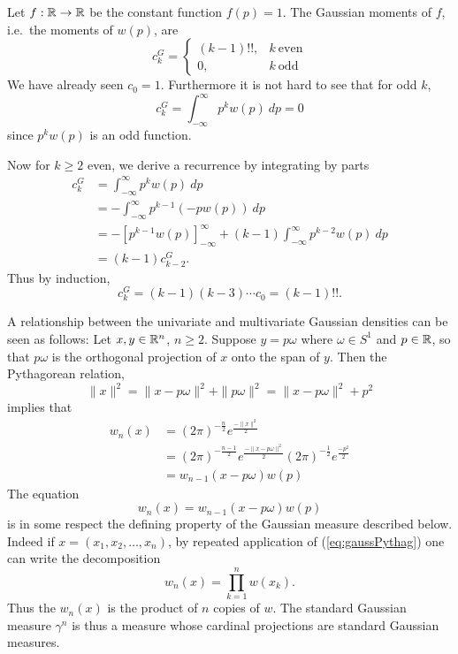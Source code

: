 \begin{myexample}
  Let $f: \mathbb{R} \rightarrow \mathbb{R}$ be the constant function $f(p)=1$. The Gaussian moments of $f$, i.e.\ the moments of $w(p)$, are
  \[
    c^G_k 
    = \begin{cases}
        (k-1)!!, & k~\text{even} \\
        0, & k~\text{odd}
    \end{cases}
  \]
  We have already seen $c_0 = 1$. Furthermore it is not hard to see that for odd $k$, 
  \[
    c^G_k = \int_{-\infty}^\infty p^k w(p) ~dp = 0
  \]
  since $p^k w(p)$ is an odd function.

  Now for $k \geq 2$ even, we derive a recurrence by integrating by parts
  \begin{align*}
    c^G_k
    &= \int_{-\infty}^\infty p^k w(p) ~dp \\
    &= -\int_{-\infty}^\infty p^{k-1} \left(-p w(p)\right) ~dp \\
    &= - \left[p^{k-1} w(p)\right]_{-\infty}^\infty + (k-1)\int_{-\infty}^\infty p^{k-2} w(p) ~dp \\
    &= (k-1)c^G_{k-2}.
  \end{align*}
  Thus by induction,
  \[
    c^G_k = (k - 1)(k - 3) \cdots c_0 = (k-1)!!.
  \]
\end{myexample}


A relationship between the univariate and multivariate Gaussian densities can be seen as follows: Let $x, y \in \mathbb{R}^n$, $n \geq 2$. Suppose $y = p\omega$ where $\omega \in S^1$ and $p \in \mathbb{R}$, so that $p\omega$ is the orthogonal projection of $x$ onto the span of $y$. Then the Pythagorean relation,
\[
  \|x\|^2 = \|x - p\omega\|^2 + \|p\omega\|^2 = \|x - p\omega\|^2 + p^2
\]
implies that
\begin{align*}
  w_n(x) 
  &= {(2\pi)}^{-\frac n2} e^{\frac{-\|x\|^2}2} \\
  &= {(2\pi)}^{-\frac{n-1}2} e^{\frac{-\|x - p\omega\|^2}2} {(2\pi)}^{-\frac12} e^{\frac{-p^2}2} \\
  &= w_{n-1}(x - p\omega)w(p)
\end{align*}
The equation
\begin{equation}\label{eq:gaussPythag}
  w_n(x) = w_{n-1}(x - p\omega)w(p)
\end{equation}
is in some respect the defining property of the Gaussian measure described below. Indeed if $x = (x_1, x_2, \ldots, x_n)$, by repeated application of (\ref{eq:gaussPythag}) one can write the decomposition
\[
  w_n(x) = \prod_{k = 1}^n w(x_k).
\]
Thus the $w_n(x)$ is the product of $n$ copies of $w$. The standard Gaussian measure $\gamma^n$ is thus a measure whose cardinal projections are standard Gaussian measures.

